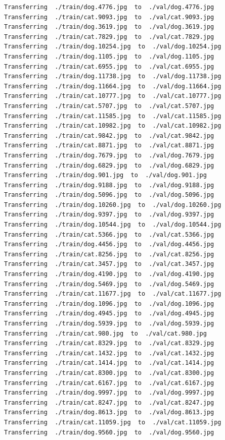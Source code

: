 \documentclass[]{book}
\theoremstyle{definition}
\theoremstyle{definition}
\theoremstyle{definition}
\theoremstyle{remark}
\begin{document}
\begin{verbatim}
Transferring  ./train/dog.4776.jpg  to  ./val/dog.4776.jpg
Transferring  ./train/cat.9093.jpg  to  ./val/cat.9093.jpg
Transferring  ./train/dog.3619.jpg  to  ./val/dog.3619.jpg
Transferring  ./train/cat.7829.jpg  to  ./val/cat.7829.jpg
Transferring  ./train/dog.10254.jpg  to  ./val/dog.10254.jpg
Transferring  ./train/dog.1105.jpg  to  ./val/dog.1105.jpg
Transferring  ./train/cat.6955.jpg  to  ./val/cat.6955.jpg
Transferring  ./train/dog.11738.jpg  to  ./val/dog.11738.jpg
Transferring  ./train/dog.11664.jpg  to  ./val/dog.11664.jpg
Transferring  ./train/cat.10777.jpg  to  ./val/cat.10777.jpg
Transferring  ./train/cat.5707.jpg  to  ./val/cat.5707.jpg
Transferring  ./train/cat.11585.jpg  to  ./val/cat.11585.jpg
Transferring  ./train/cat.10982.jpg  to  ./val/cat.10982.jpg
Transferring  ./train/cat.9842.jpg  to  ./val/cat.9842.jpg
Transferring  ./train/cat.8871.jpg  to  ./val/cat.8871.jpg
Transferring  ./train/dog.7679.jpg  to  ./val/dog.7679.jpg
Transferring  ./train/dog.6829.jpg  to  ./val/dog.6829.jpg
Transferring  ./train/dog.901.jpg  to  ./val/dog.901.jpg
Transferring  ./train/dog.9188.jpg  to  ./val/dog.9188.jpg
Transferring  ./train/dog.5096.jpg  to  ./val/dog.5096.jpg
Transferring  ./train/dog.10260.jpg  to  ./val/dog.10260.jpg
Transferring  ./train/dog.9397.jpg  to  ./val/dog.9397.jpg
Transferring  ./train/dog.10544.jpg  to  ./val/dog.10544.jpg
Transferring  ./train/cat.5366.jpg  to  ./val/cat.5366.jpg
Transferring  ./train/dog.4456.jpg  to  ./val/dog.4456.jpg
Transferring  ./train/cat.8256.jpg  to  ./val/cat.8256.jpg
Transferring  ./train/cat.3457.jpg  to  ./val/cat.3457.jpg
Transferring  ./train/dog.4190.jpg  to  ./val/dog.4190.jpg
Transferring  ./train/dog.5469.jpg  to  ./val/dog.5469.jpg
Transferring  ./train/cat.11677.jpg  to  ./val/cat.11677.jpg
Transferring  ./train/dog.1096.jpg  to  ./val/dog.1096.jpg
Transferring  ./train/dog.4945.jpg  to  ./val/dog.4945.jpg
Transferring  ./train/dog.5939.jpg  to  ./val/dog.5939.jpg
Transferring  ./train/cat.980.jpg  to  ./val/cat.980.jpg
Transferring  ./train/cat.8329.jpg  to  ./val/cat.8329.jpg
Transferring  ./train/cat.1432.jpg  to  ./val/cat.1432.jpg
Transferring  ./train/cat.1414.jpg  to  ./val/cat.1414.jpg
Transferring  ./train/cat.8300.jpg  to  ./val/cat.8300.jpg
Transferring  ./train/cat.6167.jpg  to  ./val/cat.6167.jpg
Transferring  ./train/dog.9997.jpg  to  ./val/dog.9997.jpg
Transferring  ./train/cat.8247.jpg  to  ./val/cat.8247.jpg
Transferring  ./train/dog.8613.jpg  to  ./val/dog.8613.jpg
Transferring  ./train/cat.11059.jpg  to  ./val/cat.11059.jpg
Transferring  ./train/dog.9560.jpg  to  ./val/dog.9560.jpg

\end{verbatim}
\end{document}
